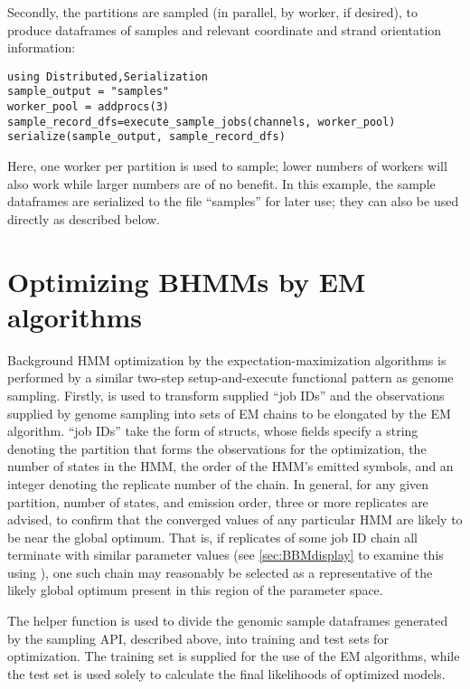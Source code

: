 Secondly, the partitions are sampled (in parallel, by worker, if desired), to produce dataframes of samples and relevant coordinate and strand orientation information:

\begin{verbatim}
using Distributed,Serialization
sample_output = "samples"
worker_pool = addprocs(3)
sample_record_dfs=execute_sample_jobs(channels, worker_pool)
serialize(sample_output, sample_record_dfs)
\end{verbatim}

Here, one worker per partition is used to sample; lower numbers of workers will also work while larger numbers are of no benefit. In this example, the sample dataframes are serialized to the file ``samples'' for later use; they can also be used directly as described below.

\section{Optimizing BHMMs by EM algorithms}
Background HMM optimization by the expectation-maximization algorithms is performed by a similar two-step setup-and-execute functional pattern as genome sampling. Firstly,  is used to transform supplied ``job IDs'' and the observations supplied by genome sampling into sets of EM chains to be elongated by the EM algorithm.  ``job IDs'' take the form of  structs, whose fields specify a string denoting the partition that forms the observations for the optimization, the number of states in the HMM, the order of the HMM's emitted symbols, and an integer denoting the replicate number of the chain. In general, for any given partition, number of states, and emission order, three or more replicates are advised, to confirm that the converged values of any particular HMM are likely to be near the global optimum. That is, if replicates of some job ID chain all terminate with similar parameter values (see \autoref{sec:BBMdisplay} to examine this using ), one such chain may reasonably be selected as a representative of the likely global optimum present in this region of the parameter space.

The helper function  is used to divide the genomic sample dataframes generated by the sampling API, described above, into training and test sets for optimization. The training set is supplied for the use of the EM algorithms, while the test set is used solely to calculate the final likelihoods of optimized models.

